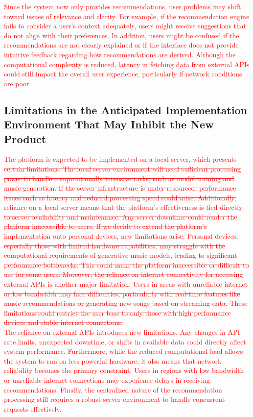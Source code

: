 \documentclass[12pt]{article}
\begin{document}
\noindent\textcolor{red}{Since the system now only provides recommendations, user problems may shift toward issues of relevance and clarity. For example, if the recommendation 
engine fails to consider a user’s context adequately, users might receive suggestions that do not align with their preferences. In addition, users might 
be confused if the recommendations are not clearly explained or if the interface does not provide intuitive feedback regarding how recommendations are derived.
 Although the computational complexity is reduced, latency in fetching data from external APIs could still impact the overall user experience, 
 particularly if network conditions are poor.}


\noindent\subsection{Limitations in the Anticipated Implementation Environment That May Inhibit the New Product}

\textcolor{red}{\sout{The platform is expected to be implemented on a local server, which presents certain limitations. The local server environment will need sufficient 
processing power to handle computationally intensive tasks, such as model training and music generation. If the server infrastructure is under-resourced, 
performance issues such as latency and reduced processing speed could arise. Additionally, reliance on a local server means that the platform's effectiveness 
is tied directly to server availability and maintenance. Any server downtime could render the platform inaccessible to users. If we decide to extend the platform's 
implementation onto personal devices, new limitations arise. Personal devices, especially those with limited hardware capabilities, may struggle with the computational 
requirements of generative music models, leading to significant performance bottlenecks. This could make the platform inaccessible or difficult to use for some users. 
Moreover, the reliance on internet connectivity for accessing external APIs is another major limitation. Users in areas with unreliable internet or low bandwidth may 
face difficulties, particularly with real-time features like music recommendations or generating new songs based on streaming data. These limitations could restrict 
the user base to only those with high-performance devices and stable internet connections.}}\\

\noindent\textcolor{red}{The reliance on external APIs introduces new limitations. Any changes in API rate limits, unexpected downtime, or shifts in available data could directly 
affect system performance. Furthermore, while the reduced computational load allows the system to run on less powerful hardware, it also means that network 
reliability becomes the primary constraint. Users in regions with low bandwidth or unreliable internet connections may experience delays in receiving recommendations.
 Finally, the centralized nature of the recommendation processing still requires a robust server environment to handle concurrent requests effectively.}
\end{document}
